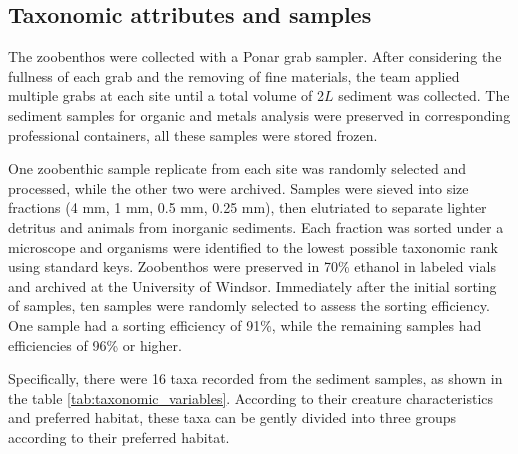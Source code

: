 

\subsection{Taxonomic attributes and samples}
The zoobenthos were collected with a Ponar grab sampler. 
After considering the fullness of each grab and the removing of fine materials,
the team applied multiple grabs at each site until a total volume of 2\(L\) sediment was collected.
The sediment samples for organic and metals analysis were preserved in corresponding professional containers, 
all these samples were stored frozen.

One zoobenthic sample replicate from each site was randomly selected and processed, 
while the other two were archived. Samples were sieved into size fractions (4 mm, 1 mm, 0.5 mm, 0.25 mm), 
then elutriated to separate lighter detritus and animals from inorganic sediments. 
Each fraction was sorted under a microscope and organisms were identified to the lowest 
possible taxonomic rank using standard keys. Zoobenthos were preserved in 70\% ethanol in 
labeled vials and archived at the University of Windsor\cite{Zhang2008}.
Immediately after the initial sorting of samples, ten samples were randomly selected to assess the sorting efficiency. 
One sample had a sorting efficiency of 91\%,
while the remaining samples had efficiencies of 96\% or higher.

Specifically, there were 16 taxa recorded from the sediment samples, as shown in the table \textcolor{blue}{\ref{tab:taxonomic_variables}}.
According to their creature characteristics and preferred habitat, 
these taxa can be gently divided into three groups according to their preferred habitat.

